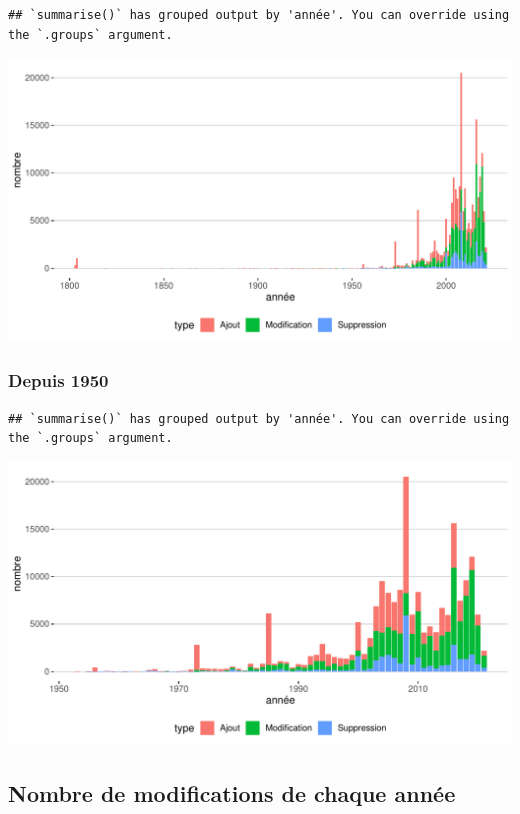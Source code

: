 \documentclass[
  oneside]{book}
\begin{document}
\begin{verbatim}
## `summarise()` has grouped output by 'année'. You can override using the `.groups` argument.
\end{verbatim}

\includegraphics{05-images_files/figure-latex/global-1.pdf}

\hypertarget{depuis-1950}{%
\subsubsection{Depuis 1950}\label{depuis-1950}}

\begin{verbatim}
## `summarise()` has grouped output by 'année'. You can override using the `.groups` argument.
\end{verbatim}

\includegraphics{05-images_files/figure-latex/global.zoom-1.pdf}

\hypertarget{nombre-de-modifications-de-chaque-annuxe9e}{%
\subsection{Nombre de modifications de chaque année}\label{nombre-de-modifications-de-chaque-annuxe9e}}
\end{document}
